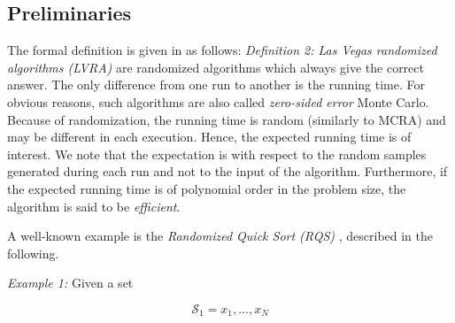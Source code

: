 \documentclass[12pt]{article}
\begin{document}
		\subsection{Preliminaries}
			The formal definition is given in \cite{bib17} as follows: 	
			\textit{Definition 2: Las Vegas randomized algorithms (LVRA)} 	are randomized algorithms which always give the correct answer. The only difference from one run to another is the 	running time.
			For obvious reasons, such algorithms are also called \emph{zero-sided error} Monte Carlo. Because of randomization, the running time is random (similarly to MCRA) and may be different in each execution. Hence, the expected running time is of interest. We note that the expectation is with respect to the random samples generated during each run and not to the input of the algorithm. Furthermore, if the expected running time is of polynomial order in the problem size, the algorithm is said to be \emph{efficient}.
			\par
			A well-known example is the \textit{Randomized Quick Sort (RQS)} \cite{bib14}, \cite{bib17} described in the following.
			\par
			\textit{Example 1:} Given a set 
			
			\begin{equation*}
				\mathscr{S}_1 = {x_1 , . . . , x_N } 
			\end{equation*}
			
\end{document}
